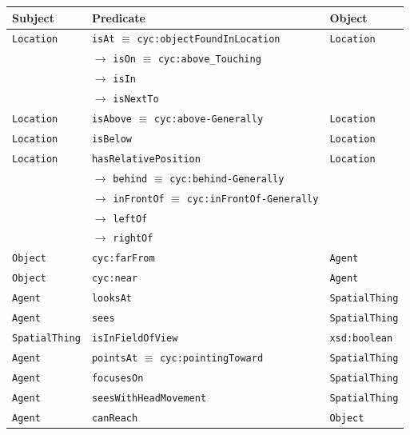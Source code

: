 \documentclass[handout,compress]{beamer}
\newcommand{\concept}[1]{{\scriptsize \texttt{#1}}}
\begin{document}
{
\begin{frame}{}
        \centering
        \scriptsize

        \begin{tabular}{p{1.5cm}lp{2cm}}
            Subject & Predicate  & Object  \\ 
            \hline
            \concept{Location} & \concept{isAt} $\equiv$ \concept{cyc:objectFoundInLocation}  &  \concept{Location}  \\ 
                               &  $\rightarrow$ \concept{isOn} $\equiv$ \concept{cyc:above\_Touching}  &   \\ 
                               &  $\rightarrow$ \concept{isIn}  &   \\ 
                               &  $\rightarrow$ \concept{isNextTo}  &   \\ 

            \concept{Location}  & \concept{isAbove} $\equiv$ \concept{cyc:above-Generally}  &  \concept{Location} \\ 
            \concept{Location}  & \concept{isBelow}  & \concept{Location} \\
            \hline
            \concept{Location}  & \concept{hasRelativePosition}  & \concept{Location}  \\ 
                                   & 	$\rightarrow$ \concept{behind} $\equiv$ \concept{cyc:behind-Generally}  & \\ 
                                      &  $\rightarrow$ \concept{inFrontOf} $\equiv$ \concept{cyc:inFrontOf-Generally}  & \\ 
                                         &  $\rightarrow$ \concept{leftOf}  &  \\ 
                                            &  $\rightarrow$ \concept{rightOf}  & 	 \\ 
            \concept{Object}  & \concept{cyc:farFrom}  &  \concept{Agent} \\ 
            \concept{Object}  & \concept{cyc:near}  &  \concept{Agent} \\

            \hline
            \concept{Agent}  & \concept{looksAt}  & \concept{SpatialThing} \\
            \concept{Agent}  & \concept{sees}  &  \concept{SpatialThing}  \\ 
            \concept{SpatialThing}  & \concept{isInFieldOfView}  & \concept{xsd:boolean}  \\ 
            \concept{Agent}  & \concept{pointsAt} $\equiv$ \concept{cyc:pointingToward}  & \concept{SpatialThing} \\ 
            \concept{Agent}  & \concept{focusesOn}  &  \concept{SpatialThing}  \\ 
            \concept{Agent} & \concept{seesWithHeadMovement} &  \concept{SpatialThing} \\
            \concept{Agent} & \concept{canReach} &  \concept{Object} \\ 


\end{tabular}
\end{frame}}
\end{document}
